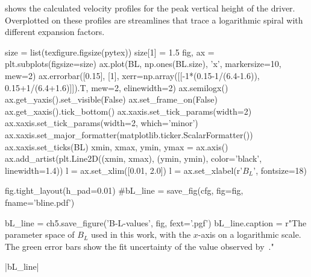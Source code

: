  shows the calculated velocity profiles for the peak vertical height of the driver.
Overplotted on these profiles are streamlines that trace a logarithmic spiral with different expansion factors.

\begin{pycode}[chapter5]
size = list(texfigure.figsize(pytex))
size[1] = 1.5
fig, ax = plt.subplots(figsize=size)
ax.plot(BL, np.ones(BL.size), 'x', markersize=10, mew=2)
ax.errorbar([0.15], [1], xerr=np.array([[-1*(0.15-1/(6.4-1.6)), 0.15+1/(6.4+1.6)]]).T, mew=2, elinewidth=2)
ax.semilogx()
ax.get_yaxis().set_visible(False)
ax.set_frame_on(False)
ax.get_xaxis().tick_bottom()
ax.xaxis.set_tick_params(width=2)
ax.xaxis.set_tick_params(width=2, which='minor')
ax.xaxis.set_major_formatter(matplotlib.ticker.ScalarFormatter())
ax.xaxis.set_ticks(BL)
xmin, xmax, ymin, ymax = ax.axis()
ax.add_artist(plt.Line2D((xmin, xmax), (ymin, ymin), color='black', linewidth=1.4))
l = ax.set_xlim([0.01, 2.0])
l = ax.set_xlabel(r'$B_L$', fontsize=18)

fig.tight_layout(h_pad=0.01)
#bL_line = save_fig(cfg, fig=fig, fname='bline.pdf')

bL_line = ch5.save_figure('B-L-values', fig, fext='.pgf')
bL_line.caption = r"The parameter space of $B_L$ used in this work, with the $x$-axis on a logarithmic scale. The green error bars show the fit uncertainty of the value observed by~\citet{bonet2008}."
\end{pycode}

\py[chapter5]|bL_line|

